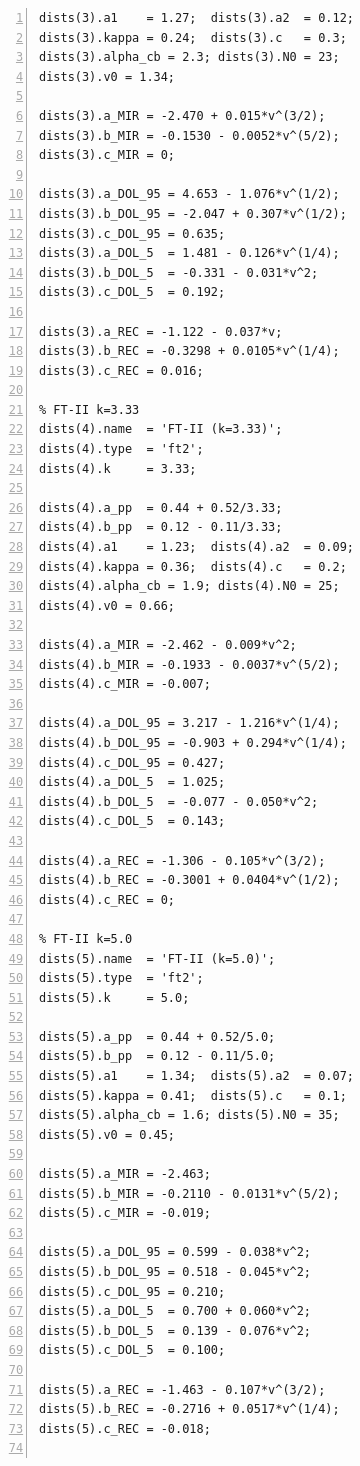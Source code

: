 \documentclass[a4paper, 11pt]{article}
\begin{document}
\begin{lstlisting}[frame=single, numbers=left, style=Matlab-Pyglike]
dists(3).a1    = 1.27;  dists(3).a2  = 0.12;
dists(3).kappa = 0.24;  dists(3).c   = 0.3; 
dists(3).alpha_cb = 2.3; dists(3).N0 = 23;
dists(3).v0 = 1.34;

dists(3).a_MIR = -2.470 + 0.015*v^(3/2);
dists(3).b_MIR = -0.1530 - 0.0052*v^(5/2);
dists(3).c_MIR = 0;

dists(3).a_DOL_95 = 4.653 - 1.076*v^(1/2);  
dists(3).b_DOL_95 = -2.047 + 0.307*v^(1/2); 
dists(3).c_DOL_95 = 0.635;
dists(3).a_DOL_5  = 1.481 - 0.126*v^(1/4);  
dists(3).b_DOL_5  = -0.331 - 0.031*v^2;     
dists(3).c_DOL_5  = 0.192;

dists(3).a_REC = -1.122 - 0.037*v;
dists(3).b_REC = -0.3298 + 0.0105*v^(1/4);
dists(3).c_REC = 0.016;

% FT-II k=3.33
dists(4).name  = 'FT-II (k=3.33)';
dists(4).type  = 'ft2';
dists(4).k     = 3.33;

dists(4).a_pp  = 0.44 + 0.52/3.33;
dists(4).b_pp  = 0.12 - 0.11/3.33;
dists(4).a1    = 1.23;  dists(4).a2  = 0.09;
dists(4).kappa = 0.36;  dists(4).c   = 0.2;  
dists(4).alpha_cb = 1.9; dists(4).N0 = 25;    
dists(4).v0 = 0.66;

dists(4).a_MIR = -2.462 - 0.009*v^2;
dists(4).b_MIR = -0.1933 - 0.0037*v^(5/2);
dists(4).c_MIR = -0.007;

dists(4).a_DOL_95 = 3.217 - 1.216*v^(1/4);  
dists(4).b_DOL_95 = -0.903 + 0.294*v^(1/4); 
dists(4).c_DOL_95 = 0.427;
dists(4).a_DOL_5  = 1.025;                   
dists(4).b_DOL_5  = -0.077 - 0.050*v^2;      
dists(4).c_DOL_5  = 0.143;

dists(4).a_REC = -1.306 - 0.105*v^(3/2);
dists(4).b_REC = -0.3001 + 0.0404*v^(1/2);
dists(4).c_REC = 0;

% FT-II k=5.0
dists(5).name  = 'FT-II (k=5.0)';
dists(5).type  = 'ft2';
dists(5).k     = 5.0;

dists(5).a_pp  = 0.44 + 0.52/5.0;
dists(5).b_pp  = 0.12 - 0.11/5.0;
dists(5).a1    = 1.34;  dists(5).a2  = 0.07;
dists(5).kappa = 0.41;  dists(5).c   = 0.1;  
dists(5).alpha_cb = 1.6; dists(5).N0 = 35;    
dists(5).v0 = 0.45;

dists(5).a_MIR = -2.463;
dists(5).b_MIR = -0.2110 - 0.0131*v^(5/2);
dists(5).c_MIR = -0.019;

dists(5).a_DOL_95 = 0.599 - 0.038*v^2;      
dists(5).b_DOL_95 = 0.518 - 0.045*v^2;      
dists(5).c_DOL_95 = 0.210;
dists(5).a_DOL_5  = 0.700 + 0.060*v^2;      
dists(5).b_DOL_5  = 0.139 - 0.076*v^2;      
dists(5).c_DOL_5  = 0.100;

dists(5).a_REC = -1.463 - 0.107*v^(3/2);
dists(5).b_REC = -0.2716 + 0.0517*v^(1/4);
dists(5).c_REC = -0.018;


\end{lstlisting}
\end{document}
